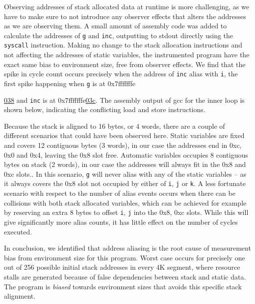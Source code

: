 \documentclass[a4paper,10pt,twocolumn,twoside]{article}
\begin{document}
Observing addresses of stack allocated data at runtime is more challenging, as we have to make sure to not introduce any observer effects that alters the addresses as we are observing them.
A small amount of assembly code was added to calculate the addresses of \texttt{g} and \texttt{inc}, outputting to stdout directly using the \texttt{syscall} instruction.
Making no change to the stack allocation instructions and not affecting the addresses of static variables, the instrumented program have the exact same bias to environment size, free from observer effects.
We find that the spike in cycle count occurs precisely when the address of \texttt{inc} alias with \texttt{i}, the first spike happening when \texttt{g} is at 0x7fffffffe{\underline{038} and \texttt{inc} is at 0x7fffffffe{\underline{03c}}.
The assembly output of gcc for the inner loop is shown below, indicating the conflicting load and store instructions.



Because the stack is aligned to 16 bytes, or 4 words, there are a couple of different scenarios that could have been observed here.
Static variables are fixed and covers 12 contiguous bytes (3 words), in our case the addresses end in 0xc, 0x0 and 0x4, leaving the 0x8 slot free.
Automatic variables occupies 8 contiguous bytes on stack (2 words), in our case the addresses will always fit in the 0x8 and 0xc slots..
In this scenario, \texttt{g} will never alias with any of the static variables -- as it always covers the 0x8 slot not occupied by either of \texttt{i}, \texttt{j} or \texttt{k}.
A less fortunate scenario with respect to the number of alias events occurs when there can be collisions with both stack allocated variables, which can be achieved for example by reserving an extra 8 bytes to offset \texttt{i}, \texttt{j} into the 0x8, 0xc slots. 
While this will give significantly more alias counts, it has little effect on the number of cycles executed.

In conclusion, we identified that address aliasing is the root cause of measurement bias from environment size for this program.
Worst case occurs for precisely one out of 256 possible initial stack addresses in every 4K segment, where resource stalls are generated because of false dependencies between stack and static data.
The program is \emph{biased} towards environment sizes that avoids this specific stack alignment.


}
\end{document}
